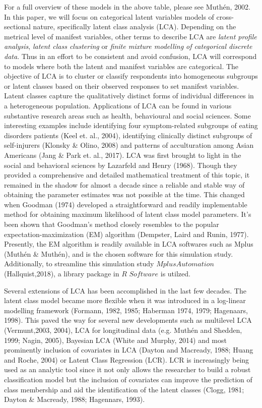 \vspace{0.5em} 
For a full overview of these models in the above table, please see Muth\'en, 2002. In this paper, we will focus on categorical latent variables models of cross-sectional nature, specifically latent class analysis (LCA). Depending on the metrical level of manifest variables, other terms to describe LCA are \textit{latent profile analysis}, \textit{latent class clustering} or \textit{finite mixture modelling of categorical discrete data}. Thus in an effort to be consistent and avoid confusion, LCA will correspond to models where both the latent and manifest variables are categorical. The objective of LCA is to cluster or classify respondents into homogeneous subgroups or latent classes based on their observed responses to set manifest variables. Latent classes capture the qualitatively distinct forms of individual differences in a heterogeneous population. Applications of LCA can be found in various substantive research areas such as health, behavioural and social sciences. Some interesting examples include identifying four symptom-related subgroups of eating disorders patients (Keel et. al., 2004), identifying clinically distinct subgroups of self-injurers (Klonsky \& Olino, 2008) and patterns of acculturation among Asian Americans (Jang & Park et. al., 2017). LCA was first brought to light in the social and behavioral sciences by Lazarfeld and Henry (1968). Though they provided a comprehensive and detailed mathematical treatment of this topic, it remained in the shadow for almost a decade since a reliable and stable way of obtaining the parameter estimates was not possible at the time. This changed when Goodman (1974) developed a straightforward and readily implementable method for obtaining maximum likelihood of latent class model parameters. It's been shown that Goodman's method closely resembles to the popular expectation-maximization (EM) algorithm (Dempster, Laird and Runin, 1977). Presently, the EM algorithm is readily available in LCA softwares such as Mplus (Muth\'en & Muth\'en), and is the chosen software for this simulation study. Additionally, to streamline this simulation study $MplusAutomation$ (Hallquist,2018), a library package in $R$ $Software$ is utilzed. 

Several extensions of LCA has been accomplished in the last few decades. The latent class model became more flexible when it was introduced in a log-linear modelling framework (Formann, 1982, 1985; Haberman 1974, 1979; Hagenaars, 1998). This paved the way  for several new developments such as multilevel LCA (Vermunt,2003, 2004), LCA for longitudinal data (e.g. Muth\'en and Shedden, 1999; Nagin, 2005), Bayesian LCA (White and Murphy, 2014) and most prominently inclusion of covariates in LCA (Dayton and Macready, 1988; Huang and Roche, 2004) or Latent Class Regression (LCR). LCR is increasingly being used as an analytic tool since it not only allows the researcher to build a robust classification model but the inclusion of covariates can improve the prediction of class membership and aid the identification of the latent classes (Clogg, 1981; Dayton & Macready, 1988; Hagennars, 1993). 

